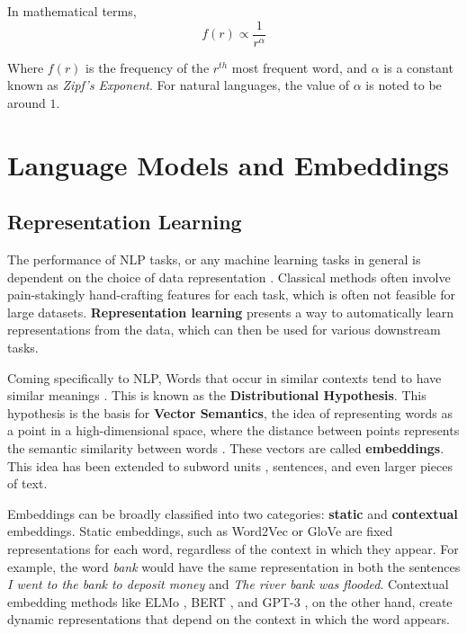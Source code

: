 In mathematical terms,
\begin{equation}
    f(r) \propto \frac{1}{r^\alpha}
\end{equation}

Where $f(r)$ is the frequency of the $r^{th}$ most frequent word, and $\alpha$ is a constant known as \textit{Zipf's Exponent}. For natural languages,
the value of $\alpha$ is noted to be around $1$.

\section{Language Models and Embeddings}

\subsection{Representation Learning}
The performance of NLP tasks, or any machine learning tasks in general is dependent on the choice of data representation \cite{bengioRepresentationLearningReview2014}.
Classical methods often involve pain-stakingly hand-crafting features for each task, which is often not feasible for large datasets. \textbf{Representation learning}
presents a way to automatically learn representations from the data, which can then be used for various downstream tasks. 

Coming specifically to NLP, Words that occur in similar contexts tend to have similar meanings \cite{harrisDistributionalStructure1954}. This is 
known as the \textbf{Distributional Hypothesis}. This hypothesis is the basis for \textbf{Vector Semantics}, the idea of representing words as a point
in a high-dimensional space, where the distance between points represents the semantic similarity between words \cite{jm3}. These vectors are called 
\textbf{embeddings}. This idea has been extended to subword units \cite{wuGooglesNeuralMachine2016}, sentences, and even larger pieces of text.

Embeddings can be broadly classified into two categories: \textbf{static} and \textbf{contextual} embeddings. Static embeddings, such as 
Word2Vec \cite{mikolovDistributedRepresentationsWords2013} or GloVe \cite{penningtonGloVeGlobalVectors2014} are fixed representations
for each word, regardless of the context in which they appear. For example, the word \textit{bank} would have the same representation in both the sentences
\textit{I went to the bank to deposit money} and \textit{The river bank was flooded}. Contextual embedding methods like ELMo \cite{petersDeepContextualizedWord2018}, BERT \cite{devlinBERTPretrainingDeep2019}, 
and GPT-3 \cite{brownLanguageModelsAre2020}, on the other hand, create dynamic representations that depend on the context in which the word appears.

